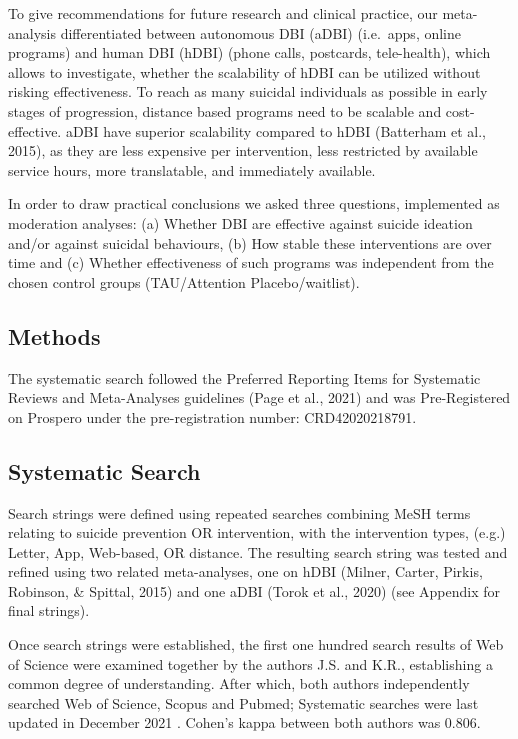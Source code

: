 \documentclass[
  english,
  man]{apa6}
\begin{document}
To give recommendations for future research and clinical practice, our meta-analysis differentiated between autonomous DBI (aDBI) (i.e.~apps, online programs) and human DBI (hDBI) (phone calls, postcards, tele-health), which allows to investigate, whether the scalability of hDBI can be utilized without risking effectiveness. To reach as many suicidal individuals as possible in early stages of progression, distance based programs need to be scalable and cost-effective. aDBI have superior scalability compared to hDBI (Batterham et al., 2015), as they are less expensive per intervention, less restricted by available service hours, more translatable, and immediately available.

In order to draw practical conclusions we asked three questions, implemented as moderation analyses: (a) Whether DBI are effective against suicide ideation and/or against suicidal behaviours, (b) How stable these interventions are over time and (c) Whether effectiveness of such programs was independent from the chosen control groups (TAU/Attention Placebo/waitlist).

\hypertarget{methods}{%
\subsection{Methods}\label{methods}}

The systematic search followed the Preferred Reporting Items for Systematic Reviews and Meta-Analyses guidelines (Page et al., 2021) and was Pre-Registered on Prospero under the pre-registration number: CRD42020218791.

\hypertarget{systematic-search}{%
\subsection{Systematic Search}\label{systematic-search}}

Search strings were defined using repeated searches combining MeSH terms relating to suicide prevention OR intervention, with the intervention types, (e.g.) Letter, App, Web-based, OR distance. The resulting search string was tested and refined using two related meta-analyses, one on hDBI (Milner, Carter, Pirkis, Robinson, \& Spittal, 2015) and one aDBI (Torok et al., 2020) (see Appendix for final strings).

Once search strings were established, the first one hundred search results of Web of Science were examined together by the authors J.S. and K.R., establishing a common degree of understanding. After which, both authors independently searched Web of Science, Scopus and Pubmed; Systematic searches were last updated in December 2021 . Cohen's kappa between both authors was 0.806.
\end{document}
